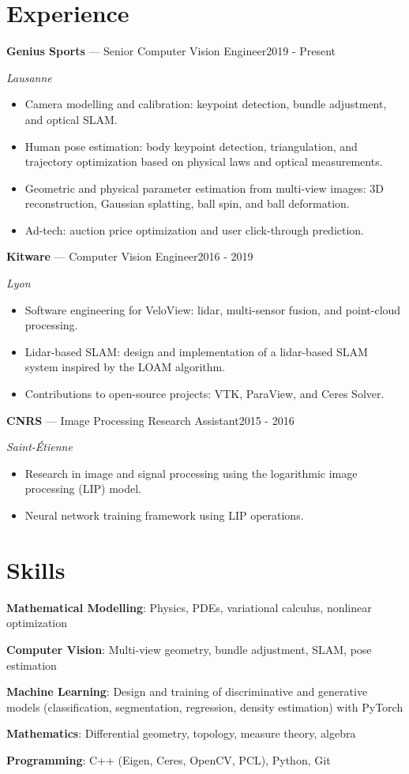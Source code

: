 \documentclass[10pt,a4paper]{article}
\newcommand{\entry}[2]{\textbf{#1}: #2\par}
\begin{document}
\section{Experience}
\textbf{Genius Sports} --- Senior Computer Vision Engineer\hfill {\small 2019 - Present}\par
{\small\itshape Lausanne}\vspace{-3pt}
\begin{itemize}
\item Camera modelling and calibration: keypoint detection, bundle adjustment, and optical SLAM.
\item Human pose estimation: body keypoint detection, triangulation, and trajectory optimization based on physical laws and optical measurements.
\item Geometric and physical parameter estimation from multi-view images: 3D reconstruction, Gaussian splatting, ball spin, and ball deformation.
\item Ad-tech: auction price optimization and user click-through prediction.
\end{itemize}
\textbf{Kitware} --- Computer Vision Engineer\hfill {\small 2016 - 2019}\par
{\small\itshape Lyon}\vspace{-3pt}
\begin{itemize}
\item Software engineering for VeloView: lidar, multi-sensor fusion, and point-cloud processing.
\item Lidar-based SLAM: design and implementation of a lidar-based SLAM system inspired by the LOAM algorithm.
\item Contributions to open-source projects: VTK, ParaView, and Ceres Solver.
\end{itemize}
\textbf{CNRS} --- Image Processing Research Assistant\hfill {\small 2015 - 2016}\par
{\small\itshape Saint-Étienne}\vspace{-3pt}
\begin{itemize}
\item Research in image and signal processing using the logarithmic image processing (LIP) model.
\item Neural network training framework using LIP operations.
\end{itemize}
\section{Skills}
\entry{Mathematical Modelling}{Physics, PDEs, variational calculus, nonlinear optimization}
\entry{Computer Vision}{Multi-view geometry, bundle adjustment, SLAM, pose estimation}
\entry{Machine Learning}{Design and training of discriminative and generative models (classification, segmentation, regression, density estimation) with PyTorch}
\entry{Mathematics}{Differential geometry, topology, measure theory, algebra}
\entry{Programming}{C++ (Eigen, Ceres, OpenCV, PCL), Python, Git}
\end{document}
